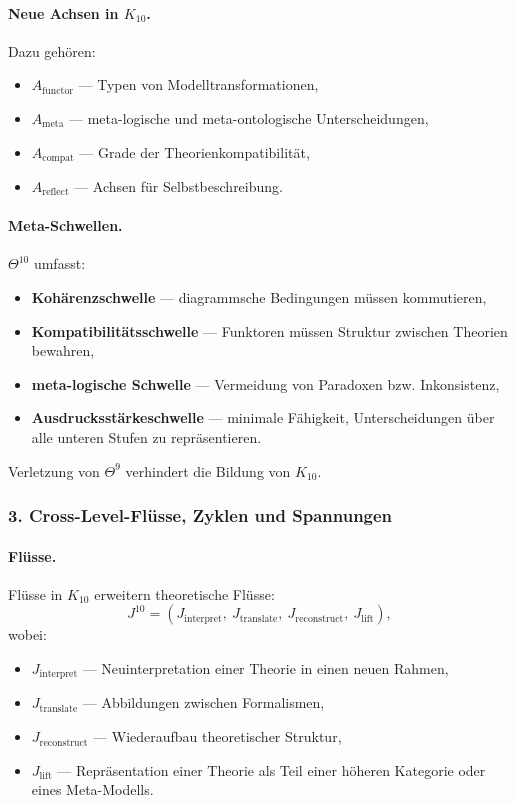 \paragraph{Neue Achsen in $K_{10}$.}
Dazu gehören:
\begin{itemize}
  \item $A_{\mathrm{functor}}$ — Typen von Modelltransformationen,
  \item $A_{\mathrm{meta}}$ — meta-logische und meta-ontologische Unterscheidungen,
  \item $A_{\mathrm{compat}}$ — Grade der Theorienkompatibilität,
  \item $A_{\mathrm{reflect}}$ — Achsen für Selbstbeschreibung.
\end{itemize}

\paragraph{Meta-Schwellen.}
$\Theta^{10}$ umfasst:
\begin{itemize}
  \item \textbf{Kohärenzschwelle} — diagrammsche Bedingungen müssen kommutieren,
  \item \textbf{Kompatibilitätsschwelle} — Funktoren müssen Struktur zwischen Theorien
        bewahren,
  \item \textbf{meta-logische Schwelle} — Vermeidung von Paradoxen bzw. Inkonsistenz,
  \item \textbf{Ausdrucksstärkeschwelle} — minimale Fähigkeit, Unterscheidungen
        über alle unteren Stufen zu repräsentieren.
\end{itemize}

Verletzung von $\Theta^9$ verhindert die Bildung von $K_{10}$.

\subsubsection{3. Cross-Level-Flüsse, Zyklen und Spannungen}

\paragraph{Flüsse.}
Flüsse in $K_{10}$ erweitern theoretische Flüsse:
\[
J^{10} = (J_{\mathrm{interpret}},\ J_{\mathrm{translate}},\
         J_{\mathrm{reconstruct}},\ J_{\mathrm{lift}}),
\]
wobei:
\begin{itemize}
  \item $J_{\mathrm{interpret}}$ — Neuinterpretation einer Theorie in einen neuen Rahmen,
  \item $J_{\mathrm{translate}}$ — Abbildungen zwischen Formalismen,
  \item $J_{\mathrm{reconstruct}}$ — Wiederaufbau theoretischer Struktur,
  \item $J_{\mathrm{lift}}$ — Repräsentation einer Theorie als Teil einer höheren
        Kategorie oder eines Meta-Modells.
\end{itemize}

